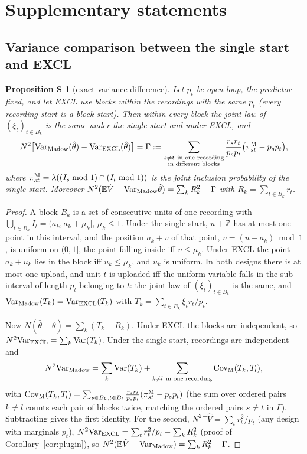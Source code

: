 \documentclass[11pt]{article}
\newtheorem{supp}{Proposition S}
\theoremstyle{remark}
\newcommand{\E}{\mathbb{E}}
\newcommand{\Var}{\mathrm{Var}}
\newcommand{\hth}{\hat\theta}
\newcommand{\hV}{\hat V}
\begin{document}
\section{Supplementary statements}\label{sec:supp}

\subsection{Variance comparison between the single start and EXCL}
\begin{supp}[exact variance difference]\label{supp:var}
Let $p_t$ be open loop, the predictor fixed, and let EXCL use blocks within the recordings with the same $p_t$ (every recording start is a block start). Then within every block the joint law of $(\xi_t)_{t\in B_k}$ is the same under the single start and under EXCL, and
\[
N^2\big[\Var_{\rm Madow}(\hth)-\Var_{\rm EXCL}(\hth)\big]=\Gamma:=\sum_{\substack{s\ne t\ \text{in one recording}\\ \text{in different blocks}}}\frac{r_sr_t}{p_sp_t}\big(\pi^{\rm M}_{st}-p_sp_t\big),
\]
where $\pi^{\rm M}_{st}=\lambda((I_s\bmod1)\cap(I_t\bmod1))$ is the joint inclusion probability of the single start. Moreover $N^2(\E\hV-\Var_{\rm Madow}\hth)=\sum_kR_k^2-\Gamma$ with $R_k=\sum_{t\in B_k}r_t$.
\end{supp}

\begin{proof}
A block $B_k$ is a set of consecutive units of one recording with $\bigcup_{t\in B_k}I_t=(a_k,a_k+\mu_k]$, $\mu_k\le1$. Under the single start, $u+\mathbb Z$ has at most one point in this interval, and the position $a_k+v$ of that point, $v=(u-a_k)\bmod 1$, is uniform on $(0,1]$, the point falling inside iff $v\le\mu_k$. Under EXCL the point $a_k+u_k$ lies in the block iff $u_k\le\mu_k$, and $u_k$ is uniform. In both designs there is at most one upload, and unit $t$ is uploaded iff the uniform variable falls in the sub-interval of length $p_t$ belonging to $t$: the joint law of $(\xi_t)_{t\in B_k}$ is the same, and $\Var_{\rm Madow}(T_k)=\Var_{\rm EXCL}(T_k)$ with $T_k=\sum_{t\in B_k}\xi_tr_t/p_t$.

Now $N(\hth-\theta)=\sum_k(T_k-R_k)$. Under EXCL the blocks are independent, so $N^2\Var_{\rm EXCL}=\sum_k\Var(T_k)$. Under the single start, recordings are independent and
\[
N^2\Var_{\rm Madow}=\sum_k\Var(T_k)+\sum_{k\ne l\ \text{in one recording}}\mathrm{Cov}_{\rm M}(T_k,T_l),
\]
with $\mathrm{Cov}_{\rm M}(T_k,T_l)=\sum_{s\in B_k,t\in B_l}\frac{r_sr_t}{p_sp_t}(\pi^{\rm M}_{st}-p_sp_t)$ (the sum over ordered pairs $k\ne l$ counts each pair of blocks twice, matching the ordered pairs $s\ne t$ in $\Gamma$). Subtracting gives the first identity. For the second, $N^2\E\hV=\sum_tr_t^2/p_t$ (any design with marginals $p_t$), $N^2\Var_{\rm EXCL}=\sum_tr_t^2/p_t-\sum_kR_k^2$ (proof of Corollary~\ref{cor:plugin}), so $N^2(\E\hV-\Var_{\rm Madow})=\sum_kR_k^2-\Gamma$.
\end{proof}
\end{document}
